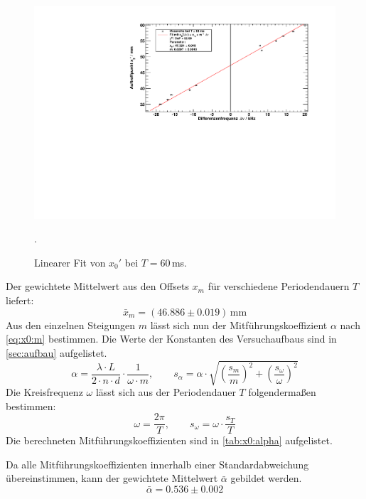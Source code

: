 \begin{figure}[H]
\begin{center}
  \includegraphics[width=\textwidth]{../img/fit_T_60ms.pdf}
  \caption{Linearer Fit von $x_0'$ bei $T = 60$\,ms.}.
  \label{img:fit:x0:60ms}
\end{center}
\end{figure}



Der gewichtete Mittelwert aus den Offsets $x_m$ für verschiedene Periodendauern $T$ liefert:
\begin{equation}
  \label{eq:xm}
  \bar{x}_{m} = (46.886 \pm 0.019)\,\text{mm}
\end{equation}
Aus den einzelnen Steigungen $m$ lässt sich nun der Mitführungskoeffizient $\alpha$ nach \autoref{eq:x0:m} bestimmen. Die Werte der Konstanten des 
Versuchaufbaus sind in \autoref{sec:aufbau} aufgelistet.
\begin{equation}
  \alpha = \frac{\lambda \cdot L}{2 \cdot n \cdot d} \cdot \frac{1}{\omega \cdot m}, \qquad
  s_{\alpha} = \alpha \cdot \sqrt{\left(\frac{s_m}{m}\right)^2 + \left(\frac{s_\omega}{\omega}\right)^2}
\end{equation}
Die Kreisfrequenz $\omega$ lässt sich aus der Periodendauer $T$ folgendermaßen bestimmen:
\begin{equation}
  \label{eq:omega}
  \omega = \frac{2 \pi}{T}, \qquad s_{\omega} = \omega \cdot \frac{s_T}{T}
\end{equation}
Die berechneten Mitführungskoeffizienten sind in \autoref{tab:x0:alpha} aufgelistet.

Da alle Mitführungskoeffizienten innerhalb einer Standardabweichung übereinstimmen, kann der gewichtete Mittelwert $\bar{\alpha}$ gebildet werden.
\begin{equation}
  \label{eq:x0:alpha:avg}
  \bar{\alpha} = 0.536 \pm 0.002
\end{equation}

